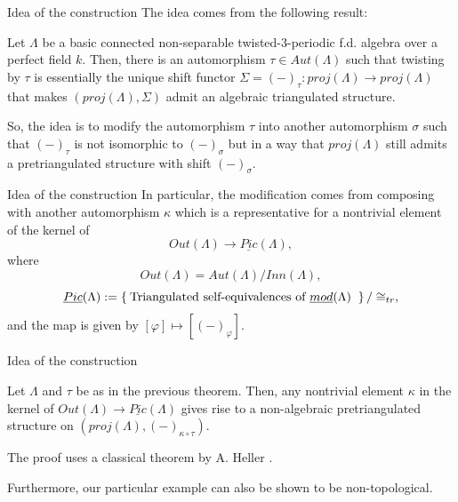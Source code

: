 \documentclass{beamer}
\begin{document}
\begin{frame}{Idea of the construction}
    The idea comes from the following result:

\begin{theorem}
     Let $\Lambda$ be a basic connected non-separable twisted-3-periodic f.d. algebra over a perfect field $k$.
    Then, there is an automorphism $\tau\in Aut(\Lambda)$ such that twisting by $\tau$ is essentially the unique shift functor $\Sigma= (-)_\tau \colon proj(\Lambda) \to proj(\Lambda)$ that makes $(proj (\Lambda), \Sigma)$ admit an algebraic triangulated structure.
\end{theorem} \pause
 
So, the idea is to modify the automorphism $\tau$ into another automorphism $\sigma$ such that $(-)_\tau$ is not isomorphic to $(-)_\sigma$ but in a way that $proj(\Lambda)$ still admits a pretriangulated structure with shift $(-)_\sigma$.


\end{frame}

\begin{frame}{Idea of the construction}
    In particular, the modification comes from composing with another automorphism $\kappa$ which is a representative for a nontrivial element of the kernel of
    $$ Out(\Lambda) \to \underline{Pic}(\Lambda), $$
     where
    $$ Out(\Lambda) = Aut(\Lambda)/Inn(\Lambda), $$
    $$ \underline{Pic}(\Lambda) := \Set{ \text{Triangulated self-equivalences of $\underline{mod}(\Lambda)$ }}/ \cong_{tr},  $$
    and the map is given by $[\varphi] \mapsto [(-)_\varphi]$.

  \end{frame}

  \begin{frame}{Idea of the construction}
    \begin{theorem}
      Let $\Lambda$ and $\tau$ be as in the previous theorem. Then, any nontrivial element $\kappa$ in the kernel of $Out(\Lambda) \to \underline{Pic}(\Lambda)$ gives rise to a non-algebraic pretriangulated structure on $(proj(\Lambda), (-)_{\kappa\circ\tau})$.
    \end{theorem}
    The proof uses a classical theorem by A. Heller \cite{heller1968stable}.

    \vspace{3mm}
    Furthermore, our particular example can also be shown to be non-topological.
  \end{frame}
\end{document}
